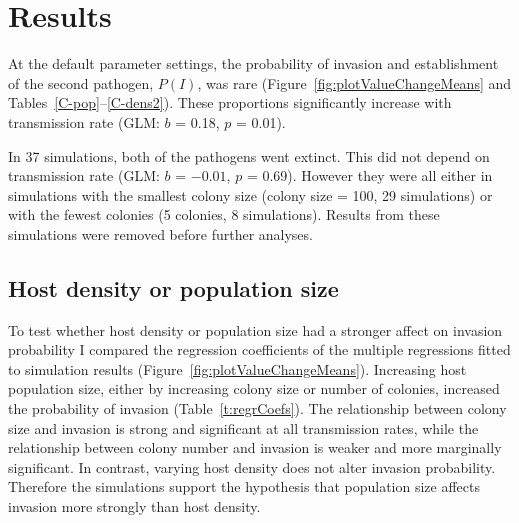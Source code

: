 

\section{Results}





At the default parameter settings, the probability of invasion and establishment of the second pathogen, $P(I)$,  was rare (Figure~\ref{fig:plotValueChangeMeans} and Tables~\ref{C-pop}--\ref{C-dens2}).
These proportions significantly increase with transmission rate (GLM: $b$ = 0.18, $p$ = 0.01).

In 37 simulations, both of the pathogens went extinct.
This did not depend on transmission rate (GLM: $b$ = \ensuremath{-0.01}, $p$ = 0.69).
However they were all either in simulations with the smallest colony size (colony size = 100, 29 simulations) or with the fewest colonies (5 colonies, 8 simulations).
Results from these simulations were removed before further analyses.



\subsection{Host density or population size}

To test whether host density or population size had a stronger affect on invasion probability I compared the regression coefficients of the multiple regressions fitted to simulation results (Figure~\ref{fig:plotValueChangeMeans}).
Increasing host population size, either by increasing colony size or number of colonies, increased the probability of invasion (Table~\ref{t:regrCoefs}).
The relationship between colony size and invasion is strong and significant at all transmission rates, while the relationship between colony number and invasion is weaker and more marginally significant.
In contrast, varying host density does not alter invasion probability.
Therefore the simulations support the hypothesis that population size affects invasion more strongly than host density.


